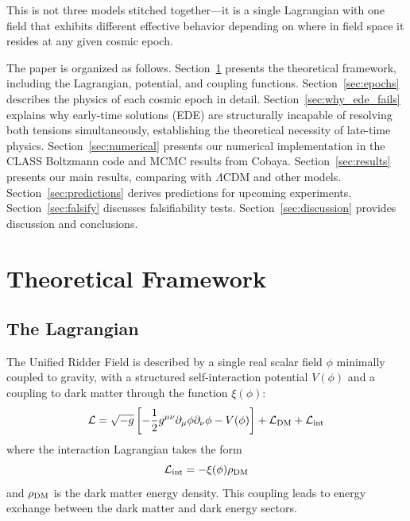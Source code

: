 \documentclass[twocolumn,showpacs,preprintnumbers,amsmath,amssymb,prd]{revtex4-2}
\begin{document}
This is not three models stitched together---it is a single Lagrangian with one field that exhibits different effective behavior depending on where in field space it resides at any given cosmic epoch.

The paper is organized as follows. Section~\ref{sec:theory} presents the theoretical framework, including the Lagrangian, potential, and coupling functions. Section~\ref{sec:epochs} describes the physics of each cosmic epoch in detail. Section~\ref{sec:why_ede_fails} explains why early-time solutions (EDE) are structurally incapable of resolving both tensions simultaneously, establishing the theoretical necessity of late-time physics. Section~\ref{sec:numerical} presents our numerical implementation in the CLASS Boltzmann code and MCMC results from Cobaya. Section~\ref{sec:results} presents our main results, comparing with $\Lambda$CDM and other models. Section~\ref{sec:predictions} derives predictions for upcoming experiments. Section~\ref{sec:falsify} discusses falsifiability tests. Section~\ref{sec:discussion} provides discussion and conclusions.

\section{Theoretical Framework}
\label{sec:theory}

\subsection{The Lagrangian}

The Unified Ridder Field is described by a single real scalar field $\phi$ minimally coupled to gravity, with a structured self-interaction potential $V(\phi)$ and a coupling to dark matter through the function $\xi(\phi)$:
\begin{equation}
\mathcal{L} = \sqrt{-g}\left[-\frac{1}{2}g^{\mu\nu}\partial_\mu\phi\partial_\nu\phi - V(\phi)\right] + \mathcal{L}_{\rm DM} + \mathcal{L}_{\rm int}
\label{eq:lagrangian}
\end{equation}
where the interaction Lagrangian takes the form
\begin{equation}
\mathcal{L}_{\rm int} = -\xi(\phi) \rho_{\rm DM}
\end{equation}
and $\rho_{\rm DM}$ is the dark matter energy density. This coupling leads to energy exchange between the dark matter and dark energy sectors.
\end{document}
